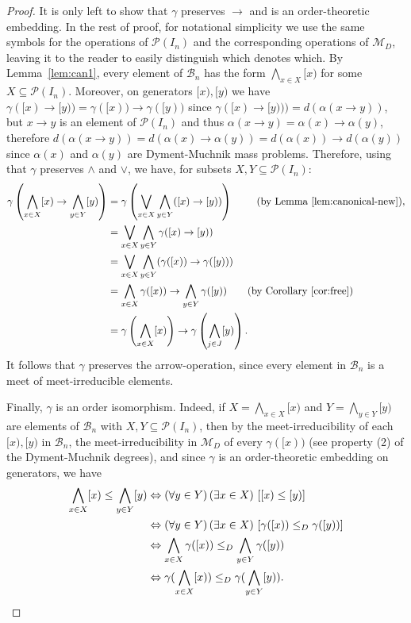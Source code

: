 \documentclass[11pt]{amsart}
\newcommand{\imp}{\rightarrow}
\newcommand{\QA}[1]{(\forall{#1})\,}
\newcommand{\QE}[1]{(\exists{#1})\,}
\begin{document}
\begin{proof}
It is only left to show that $\gamma$ preserves $\rightarrow$ and is an 
order-theoretic embedding. In the rest of proof, for notational simplicity we 
use the same symbols for the operations of $\mathscr{P}(I_n)$ and the 
corresponding operations of $\mathscr{M}_D$, leaving it to the reader to 
easily distinguish which denotes which. By Lemma~\ref{lem:can1}, every 
element of $\mathscr{B}_n$ has the form $\bigwedge_{x \in X} [x)$ for some $X 
\subseteq \mathscr{P}(I_n)$. Moreover, on generators $[x), [y)$ we have 
$\gamma([x)\imp [y))=\gamma([x)) \imp \gamma([y))$ since $\gamma([x) 
\rightarrow [y)))=d(\alpha(x \rightarrow y))$, but $x \rightarrow y$ is an 
element of $\mathscr{P}(I_n)$ and thus $\alpha(x \rightarrow y)=\alpha(x) 
\rightarrow \alpha(y)$, therefore $d(\alpha(x \rightarrow y))=d(\alpha(x) 
\rightarrow \alpha(y))=d(\alpha(x))\rightarrow d(\alpha(y))$ since 
$\alpha(x)$ and $\alpha(y)$ are Dyment-Muchnik mass problems. Therefore, 
using that $\gamma$ preserves $\wedge$ and $\lor$, we have, for subsets $X, Y 
\subseteq \mathscr{P}(I_n)$: 
\begin{align*}
\gamma\left(\bigwedge_{x \in X} [x) \rightarrow \bigwedge_{y \in Y} [y)\right) 
    &=\gamma\left(\bigvee_{x \in X}\bigwedge_{y \in Y} ([x) \rightarrow [y))\right) 
                           \qquad  \textrm{ (by Lemma~\ref{lem:canonical-new})},\\
    &=\bigvee_{x \in X} \bigwedge_{y \in Y} \gamma([x) \rightarrow [y))\\
    &=\bigvee_{x \in X} \bigwedge_{y \in Y} (\gamma([x)) \rightarrow \gamma([y)))\\
    &= \bigwedge_{x \in X}  \gamma([x)) \rightarrow 
           \bigwedge_{y \in Y} \gamma([y)) \qquad 
                     \textrm{(by Corollary~\ref{cor:free})}\\
    &= \gamma\left(\bigwedge_{x \in X} [x)\right) \rightarrow 
    \gamma\left(\bigwedge_{j\in J} [y)\right).
\end{align*} 
It follows that $\gamma$ preserves the arrow-operation, since every element 
in $\mathscr{B}_n$ is a meet of meet-irreducible elements. 

Finally, $\gamma$ is an order isomorphism. Indeed, if $X=\bigwedge_{x \in 
X}[x)$ and $Y=\bigwedge_{y \in Y}[y)$ are elements of $\mathscr{B}_n$ with 
$X,Y \subseteq \mathscr{P}(I_n)$, then by the meet-irreducibility of each $[x), 
[y)$ in $\mathscr{B}_n$, the meet-irreducibility in $\mathscr{M}_D$ of every 
$\gamma([x))$ (see property (2) of the Dyment-Muchnik degrees), and since 
$\gamma$ is an order-theoretic embedding on generators, we have 
\begin{align*}
\bigwedge_{x \in X}[x) \leq \bigwedge_{y \in Y} [y) &\Leftrightarrow
\QA{y\in Y}\QE{x \in X} \left[ [x) \leq [y) \right]\\
&\Leftrightarrow
\QA{y\in Y}\QE{x \in X} \left[\gamma([x)) \leq_D \gamma([y))\right]\\
&\Leftrightarrow \bigwedge_{x \in X} \gamma([x)) \leq_D \bigwedge_{y \in Y} 
\gamma([y))\\
&\Leftrightarrow \gamma(\bigwedge_{x \in X} [x))
             \leq_D \gamma(\bigwedge_{y \in Y}[y)). \qedhere
\end{align*} 
\end{proof} 
\end{document}
